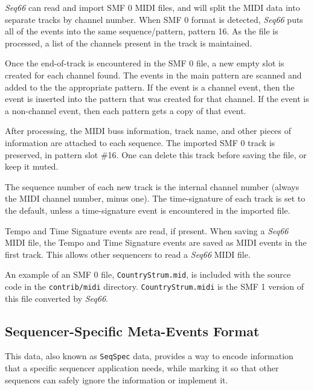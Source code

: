    \textsl{Seq66} can read and import SMF 0 MIDI files, and will split
   the MIDI data into separate tracks by channel number.
   When SMF 0 format is detected, \textsl{Seq66} puts all of
   the events into the same sequence/pattern, pattern 16.
   As the file is processed, a list of the channels present in the
   track is maintained.

   Once the end-of-track is encountered in the SMF 0 file, a new empty
   slot is created for each channel found.
   The events in the main pattern are scanned and added to the
   the appropriate pattern.  If the event is a channel event,
   then the event is inserted into the pattern that was created for that
   channel.  If the event is a non-channel event, then each pattern gets a
   copy of that event.

   After processing, the MIDI buss information, track name, and other pieces of
   information are attached to each sequence.
   The imported SMF 0 track is preserved, in
   pattern slot \#16.
   One can delete this track before saving the file, or keep it muted.

   The sequence number of each new track is the internal channel number
   (always the MIDI channel number, minus one).
   The time-signature of each track is set to the default, unless a
   time-signature event is encountered in the imported file.

   Tempo and Time Signature events are read, if present.
   When saving a \textsl{Seq66} MIDI file,
   the Tempo and Time Signature events are saved as MIDI events in
   the first track.
   This allows other sequencers to read a \textsl{Seq66} MIDI file.

   An example of an SMF 0 file, \texttt{CountryStrum.mid}, is included with
   the source code in the \texttt{contrib/midi} directory.
   \texttt{CountryStrum.midi} is the SMF 1 version of this file converted by
   \textsl{Seq66}.

\subsection{Sequencer-Specific Meta-Events Format}
\label{subsec:midi_format_meta_format}

   This data, also known as
   \texttt{SeqSpec} data, provides a way to encode information
   that a specific sequencer application needs, while marking it so that other
   sequences can safely ignore the information or implement it.

